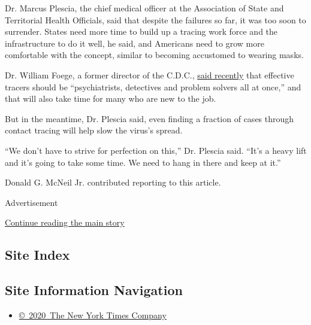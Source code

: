 Dr. Marcus Plescia, the chief medical officer at the Association of
State and Territorial Health Officials, said that despite the failures
so far, it was too soon to surrender. States need more time to build up
a tracing work force and the infrastructure to do it well, he said, and
Americans need to grow more comfortable with the concept, similar to
becoming accustomed to wearing masks.

Dr. William Foege, a former director of the C.D.C.,
\href{https://www.nytimes.com/2020/05/23/sunday-review/coronavirus-contact-tracing.html}{said
recently} that effective tracers should be ``psychiatrists, detectives
and problem solvers all at once,'' and that will also take time for many
who are new to the job.

But in the meantime, Dr. Plescia said, even finding a fraction of cases
through contact tracing will help slow the virus's spread.

``We don't have to strive for perfection on this,'' Dr. Plescia said.
``It's a heavy lift and it's going to take some time. We need to hang in
there and keep at it.''

Donald G. McNeil Jr. contributed reporting to this article.

Advertisement

\protect\hyperlink{after-bottom}{Continue reading the main story}

\hypertarget{site-index}{%
\subsection{Site Index}\label{site-index}}

\hypertarget{site-information-navigation}{%
\subsection{Site Information
Navigation}\label{site-information-navigation}}

\begin{itemize}
\tightlist
\item
  \href{https://help.nytimes.com/hc/en-us/articles/115014792127-Copyright-notice}{©~2020~The
  New York Times Company}
\end{itemize}

